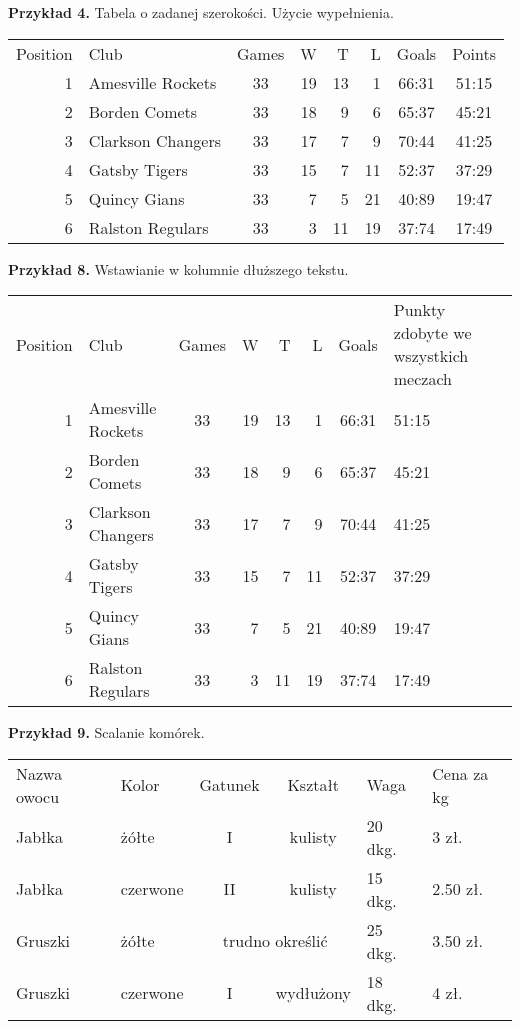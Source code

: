 \documentclass{article}
\begin{document}
\textbf{Przykład 4.} Tabela o zadanej szerokości. Użycie wypełnienia.\\

\begin{tabular*}{14cm}{rlcrrrc@{\extracolsep{\fill}}c}
Position & Club & Games & W & T & L & Goals & Points \\ [0.2ex]
1 & Amesville Rockets & 33 & 19 & 13 & 1 & 66:31 & 51:15 \\
2 & Borden Comets & 33 & 18 & 9 & 6 & 65:37 & 45:21 \\
3 & Clarkson Changers & 33 & 17 & 7 & 9 & 70:44 & 41:25 \\
4 & Gatsby Tigers & 33 & 15 & 7 & 11 & 52:37 & 37:29 \\
5 & Quincy Gians & 33 & 7 & 5 & 21 & 40:89 & 19:47\\
6 & Ralston Regulars & 33 & 3 & 11 & 19 & 37:74 & 17:49
\end{tabular*}
\vspace{.5cm}


\vspace{.5cm}
\textbf{Przykład 8.} Wstawianie w kolumnie dłuższego tekstu.
\vspace{.5cm}

\begin{tabular}{rlcrrrcp{2cm}c}
Position & Club & Games & W & T & L & Goals & Punkty zdobyte we wszystkich meczach \\ [0.2ex]
1 & Amesville Rockets & 33 & 19 & 13 & 1 & 66:31 & 51:15 \\
2 & Borden Comets & 33 & 18 & 9 & 6 & 65:37 & 45:21 \\
3 & Clarkson Changers & 33 & 17 & 7 & 9 & 70:44 & 41:25 \\
4 & Gatsby Tigers & 33 & 15 & 7 & 11 & 52:37 & 37:29 \\
5 & Quincy Gians & 33 & 7 & 5 & 21 & 40:89 & 19:47\\
6 & Ralston Regulars & 33 & 3 & 11 & 19 & 37:74 & 17:49
\end{tabular}

\vspace{.5cm}
\textbf{Przykład 9.} Scalanie komórek.
\vspace{.5cm}

\begin{tabular}{llccll}
Nazwa owocu & Kolor & Gatunek & Kształt & Waga & Cena za kg \\
Jabłka & żółte & I & kulisty & 20 dkg. & 3 zł.\\
Jabłka & czerwone & II & kulisty & 15 dkg. & 2.50 zł.\\
Gruszki & żółte &\multicolumn{2}{c}{trudno określić} & 25 dkg. & 3.50 zł.\\
Gruszki & czerwone & I & wydłużony & 18 dkg. & 4 zł.
\end{tabular}
\end{document}
